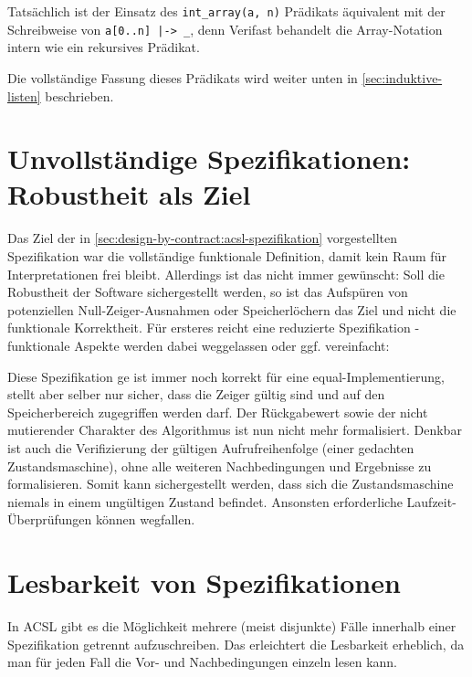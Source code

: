 Tatsächlich ist der Einsatz des \lstinline{int_array(a, n)} Prädikats äquivalent mit der Schreibweise 
von \lstinline{a[0..n] |-> _}, denn Verifast behandelt die Array-Notation intern wie ein rekursives
Prädikat.

Die vollständige Fassung dieses Prädikats wird weiter unten in \ref{sec:induktive-listen} beschrieben.



\section{Unvollständige Spezifikationen: Robustheit als Ziel}
\label{sec:design-by-contract:partielle-korrektheit}

Das Ziel der in \ref{sec:design-by-contract:acsl-spezifikation} vorgestellten Spezifikation war die
vollständige funktionale Definition, damit kein Raum für Interpretationen frei bleibt. Allerdings ist
das nicht immer gewünscht: Soll die Robustheit der Software sichergestellt werden, so ist das Aufspüren 
von potenziellen Null-Zeiger-Ausnahmen oder Speicherlöchern das Ziel und nicht die funktionale
Korrektheit. Für ersteres reicht eine reduzierte Spezifikation - funktionale Aspekte werden dabei 
weggelassen oder ggf. vereinfacht:


 
Diese Spezifikation ge ist immer noch korrekt für eine equal-Implementierung, stellt aber selber nur sicher,
dass die Zeiger gültig sind und auf den Speicherbereich zugegriffen werden darf. Der Rückgabewert sowie 
der nicht mutierender Charakter des Algorithmus ist nun nicht mehr formalisiert.
\newline
\newline
Denkbar ist auch die Verifizierung der gültigen Aufrufreihenfolge (einer gedachten Zustandsmaschine),
ohne alle weiteren Nachbedingungen und Ergebnisse zu formalisieren. Somit kann sichergestellt werden,
dass sich die Zustandsmaschine niemals in einem ungültigen Zustand befindet. Ansonsten erforderliche
Laufzeit-Überprüfungen können wegfallen.



\section{Lesbarkeit von Spezifikationen}
\label{sec:design-by-contract:behaviors}

In ACSL gibt es die Möglichkeit mehrere (meist disjunkte) Fälle innerhalb einer Spezifikation getrennt
aufzuschreiben. Das erleichtert die Lesbarkeit erheblich, da man für jeden Fall die Vor- und Nachbedingungen
einzeln lesen kann.


